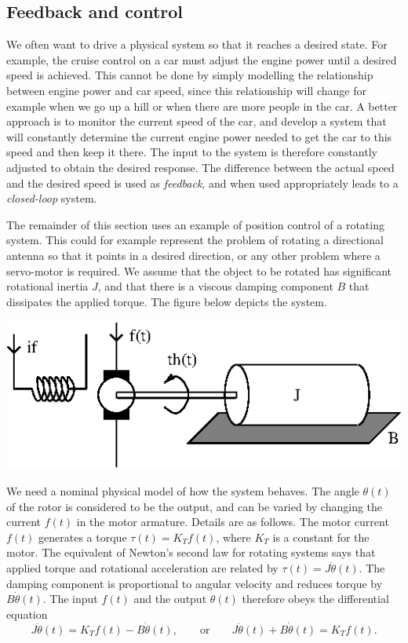 \documentclass[10pt]{beamer}
\begin{document}
\subsection{Feedback and control}

We often want to drive a physical system so that it reaches a desired state.  For example, the cruise control on a car must adjust the engine power until a desired speed is achieved.  This cannot be done by simply modelling the relationship between engine power and car speed, since this relationship will change for example when we go up a hill or when there are more people in the car.  A better approach is to monitor the current speed of the car, and develop a system that will constantly determine the current engine power needed to get the car to this speed and then keep it there.   The input to the system is therefore constantly adjusted to obtain the desired response.  The difference between the actual speed and the desired speed is used as {\em feedback}, and when used appropriately leads to a {\em closed-loop} system.

The remainder of this section uses an example of position control of a rotating system.  This could for example represent the problem of rotating a directional antenna so that it points in a desired direction, or any other problem where a servo-motor is required.  We assume that the object to be rotated has significant rotational inertia $J$, and that there is a viscous damping component $B$ that dissipates the applied torque.  The figure below depicts the system.
\begin{center}
  \includegraphics{poscontroldcmotor}
\end{center}
We need a nominal physical model of how the system behaves.  The angle $\theta(t)$ of the rotor is considered to be the output, and can be varied by changing the current $f(t)$ in the motor armature.  Details are as follows.  The motor current $f(t)$ generates a torque $\tau(t) = K_T f(t)$, where $K_T$ is a constant for the motor.  The equivalent of Newton's second law for rotating systems says that applied torque and rotational acceleration are related by $\tau(t) = J \ddot{\theta}(t)$.  The damping component is proportional to angular velocity and reduces torque by $B \dot{\theta}(t)$.  The input $f(t)$ and the output $\theta(t)$ therefore obeys the differential equation
\begin{equation*}
  J \ddot{\theta}(t) = K_T f(t) - B \dot{\theta}(t), \qquad \text{or} \qquad J \ddot{\theta}(t) + B \dot{\theta}(t) = K_T f(t).
\end{equation*}
\end{document}
